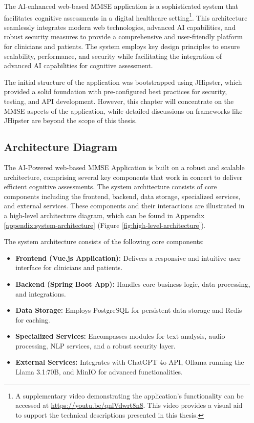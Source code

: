 The AI-enhanced web-based MMSE application is a sophisticated system that facilitates cognitive assessments in a digital healthcare setting\footnote{A supplementary video demonstrating the application's functionality can be accessed at \url{https://youtu.be/qnlVdwrt8n8}. This video provides a visual aid to support the technical descriptions presented in this thesis.}. This architecture seamlessly integrates modern web technologies, advanced AI capabilities, and robust security measures to provide a comprehensive and user-friendly platform for clinicians and patients. The system employs key design principles to ensure scalability, performance, and security while facilitating the integration of advanced AI capabilities for cognitive assessment.

The initial structure of the application was bootstrapped using JHipster, which provided a solid foundation with pre-configured best practices for security, testing, and API development. However, this chapter will concentrate on the MMSE aspects of the application, while detailed discussions on frameworks like JHipster are beyond the scope of this thesis.

\subsection{Architecture Diagram}
The AI-Powered web-based MMSE Application is built on a robust and scalable architecture, comprising several key components that work in concert to deliver efficient cognitive assessments. The system architecture consists of core components including the frontend, backend, data storage, specialized services, and external services. These components and their interactions are illustrated in a high-level architecture diagram, which can be found in Appendix \ref{appendix:system-architecture} (Figure \ref{fig:high-level-architecture}).

The system architecture consists of the following core components:
\begin{itemize}
\item \textbf{Frontend (Vue.js Application):} Delivers a responsive and intuitive user interface for clinicians and patients.
\item \textbf{Backend (Spring Boot App):} Handles core business logic, data processing, and integrations.
\item \textbf{Data Storage:} Employs PostgreSQL for persistent data storage and Redis for caching.
\item \textbf{Specialized Services:} Encompasses modules for text analysis, audio processing, NLP services, and a robust security layer.
\item \textbf{External Services:} Integrates with ChatGPT 4o API, Ollama running the Llama 3.1:70B, and MinIO for advanced functionalities.
\end{itemize}

